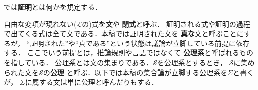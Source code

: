 	では{\bf 証明}とは何かを規定する．
	
	自由な変項が現れない($\mathcal{L}$の)式を{\bf 文}や
	{\bf 閉式}と呼ぶ．
	証明される式や証明の過程で出てくる式は全て文である．本稿では証明された文を
	{\bf 真な}文と呼ぶことにするが，
	``証明された''や``真である''という状態は議論が立脚している前提に依存する．
	ここでいう前提とは，推論規則や言語ではなくて
	{\bf 公理系}と呼ばれるものを指している．
	公理系とは文の集まりである．$\mathscr{S}$を公理系とするとき，
	$\mathscr{S}$に集められた文を$\mathscr{S}$の{\bf 公理}
	と呼ぶ．以下では本稿の集合論が立脚する公理系を$\Sigma$と書くが，
	$\Sigma$に属する文は単に公理と呼んだりもする．
	
